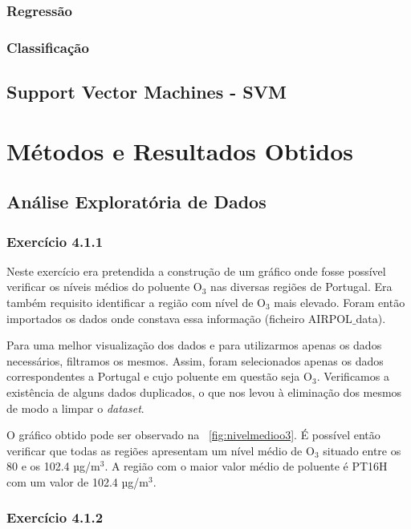 \documentclass[conference]{IEEEtran}
\begin{document}
\subsubsection{Regressão}

\subsubsection{Classificação}

\subsection{Support Vector Machines - SVM}


\section{Métodos e Resultados Obtidos}

\subsection{Análise Exploratória de Dados}
\medskip
\subsubsection{\textbf{Exercício 4.1.1}}

Neste exercício era pretendida a construção de um gráfico onde fosse possível verificar os níveis médios do poluente O$_3$ nas diversas regiões de Portugal. Era também requisito identificar a região com nível de O$_3$ mais elevado. Foram então importados os dados onde constava essa informação (ficheiro AIRPOL$\_$data).  

Para uma melhor visualização dos dados e para utilizarmos apenas os dados necessários, filtramos os mesmos. Assim, foram selecionados apenas os dados correspondentes a Portugal e cujo poluente em questão seja O$_3$. Verificamos a existência de alguns dados duplicados, o que nos levou à eliminação dos mesmos de modo a limpar o \textit{dataset}.
 
O gráfico obtido pode ser observado na \figurename~\ref{fig:nivelmedioo3}. É possível então verificar que todas as regiões apresentam um nível médio de O$_3$ situado entre os 80 e os 102.4 µg/m$^3$. A região com o maior valor médio de poluente é PT16H com um valor de 102.4 µg/m$^3$.


\medskip
\subsubsection{\textbf{Exercício 4.1.2}}
\end{document}
